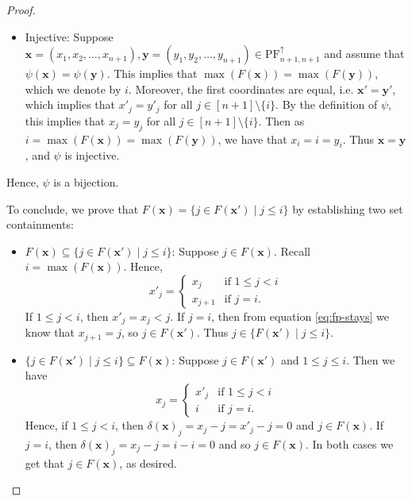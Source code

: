 \documentclass[10pt,a4paper]{amsart}
\newcommand{\NDPF}{\mathrm{PF}^{\uparrow}}
\newcommand{\x}{\mathbf{x}}
\newcommand{\y}{\mathbf{y}}
\begin{document}
\begin{proof}
\begin{itemize}[leftmargin=.2in]
        \item Injective: 
         Suppose $\x=(x_1,x_2,\ldots,x_{n+1}), \y=(y_1,y_2,\ldots,y_{n+1}) \in \NDPF_{n+1,n+1}$ and assume that $\psi(\x)=\psi(\y)$. 
         This implies that  $\max(F(\x))=\max(F(\y))$, which we denote by $i$. 
         Moreover, the first coordinates are equal, i.e. $\x'=\y'$, which implies that $x'_j = y'_j$ for all $j\in[n+1]\setminus\{i\}$. By the definition of $\psi$, this implies that $x_j = y_j$ for all $j\in[n+1]\setminus\{i\}$. Then as $i=\max(F(\x))=\max(F(\y))$, we have that $x_i=i=y_i$. Thus $\x=\y$, and $\psi$ is injective.
    \end{itemize}
    Hence, $\psi$ is a bijection. 
    
    To conclude, we prove that $F(\x) = \{j \in F(\x') \mid j \leq i\}$ by establishing two set containments:
    \begin{itemize}[leftmargin=.2in]
        \item $F(\x) \subseteq \{j \in F(\x') \mid j \leq i\}$: Suppose $j \in F(\x)$. Recall $i=\max(F(\x))$. Hence,
        \[x'_j = \begin{cases}
            x_j & \mbox{if }1\leq j < i\\
            x_{j+1} & \mbox{if }j=i.
        \end{cases}\]
        If $1\leq j < i$, then  $x'_j =x_j < j$. 
        If $j = i$, then from equation \eqref{eq:fp-stays} we know that $x_{j+1} = j$, so $j \in F(\x')$. Thus $j\in\{F(\x')\mid j\leq i\}$.
        \item $ \{j \in F(\x') \mid j \leq i\}\subseteq F(\x)$: Suppose $j \in F(\x')$ and $1\leq j \leq i$. Then we have
        \[x_j = \begin{cases}
            x'_j &\mbox{if } 1\leq j < i\\
            i & \mbox{if }j=i.
        \end{cases}\]
        Hence, if $1\leq j< i$, then $\delta(\x)_j=x_j-j=x'_j-j=0$ and $j\in F(\x)$. If $j=i$, then $\delta(\x)_j=x_j-j=i-i=0$ and so $j\in F(\x)$. 
        In both cases we get that         $j \in F(\x)$, as desired.\qedhere
    \end{itemize}
\end{proof}
\end{document}
